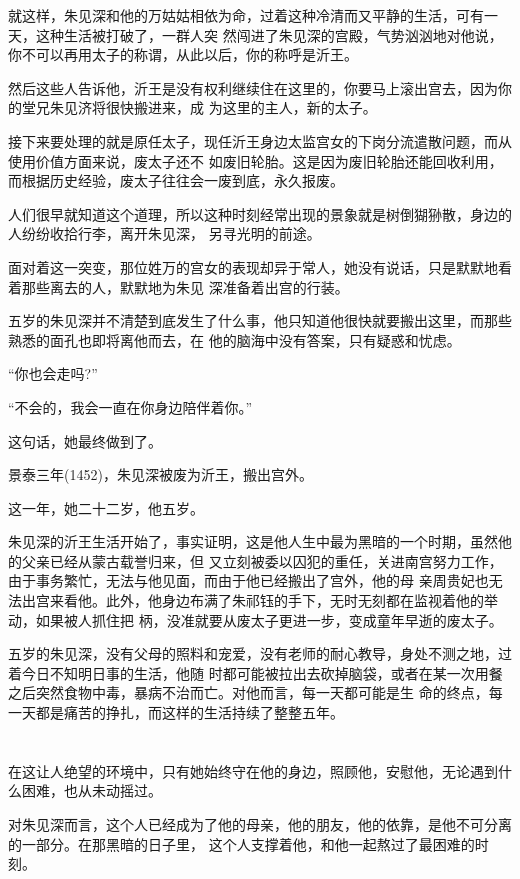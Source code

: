 \documentclass[11pt,a4paper,onecolumn]{article}
\begin{document}
就这样，朱见深和他的万姑姑相依为命，过着这种冷清而又平静的生活，可有一天，这种生活被打破了，一群人突
然闯进了朱见深的宫殿，气势汹汹地对他说，你不可以再用太子的称谓，从此以后，你的称呼是沂王。

然后这些人告诉他，沂王是没有权利继续住在这里的，你要马上滚出宫去，因为你的堂兄朱见济将很快搬进来，成
为这里的主人，新的太子。

接下来要处理的就是原任太子，现任沂王身边太监宫女的下岗分流遣散问题，而从使用价值方面来说，废太子还不
如废旧轮胎。这是因为废旧轮胎还能回收利用，而根据历史经验，废太子往往会一废到底，永久报废。

人们很早就知道这个道理，所以这种时刻经常出现的景象就是树倒猢狲散，身边的人纷纷收拾行李，离开朱见深，
另寻光明的前途。

面对着这一突变，那位姓万的宫女的表现却异于常人，她没有说话，只是默默地看着那些离去的人，默默地为朱见
深准备着出宫的行装。

五岁的朱见深并不清楚到底发生了什么事，他只知道他很快就要搬出这里，而那些熟悉的面孔也即将离他而去，在
他的脑海中没有答案，只有疑惑和忧虑。

``你也会走吗?''

``不会的，我会一直在你身边陪伴着你。''

这句话，她最终做到了。

景泰三年(1452)，朱见深被废为沂王，搬出宫外。

这一年，她二十二岁，他五岁。

朱见深的沂王生活开始了，事实证明，这是他人生中最为黑暗的一个时期，虽然他的父亲已经从蒙古载誉归来，但
又立刻被委以囚犯的重任，关进南宫努力工作，由于事务繁忙，无法与他见面，而由于他已经搬出了宫外，他的母
亲周贵妃也无法出宫来看他。此外，他身边布满了朱祁钰的手下，无时无刻都在监视着他的举动，如果被人抓住把
柄，没准就要从废太子更进一步，变成童年早逝的废太子。

五岁的朱见深，没有父母的照料和宠爱，没有老师的耐心教导，身处不测之地，过着今日不知明日事的生活，他随
时都可能被拉出去砍掉脑袋，或者在某一次用餐之后突然食物中毒，暴病不治而亡。对他而言，每一天都可能是生
命的终点，每一天都是痛苦的挣扎，而这样的生活持续了整整五年。

\section[\thesection]{}

在这让人绝望的环境中，只有她始终守在他的身边，照顾他，安慰他，无论遇到什么困难，也从未动摇过。

对朱见深而言，这个人已经成为了他的母亲，他的朋友，他的依靠，是他不可分离的一部分。在那黑暗的日子里，
这个人支撑着他，和他一起熬过了最困难的时刻。
\end{document}
